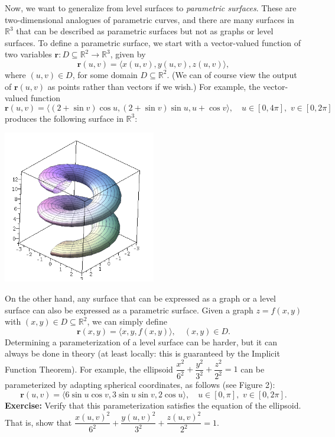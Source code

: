 \documentclass[12pt,letterpaper]{article}
\newcommand{\R}{\mathbb{R}}
\renewcommand{\r}{\mathbf{r}}
\begin{document}
Now, we want to generalize from level surfaces to \textit{parametric surfaces}. These are two-dimensional analogues of parametric curves, and there are many surfaces in $\R^3$ that can be described as parametric surfaces but not as graphs or level surfaces. To define a parametric surface, we start with a vector-valued function of two variables $\r:D\subseteq \R^2\to\R^3$, given by
\[
 \r(u,v) = \langle x(u,v), y(u,v), z(u,v)\rangle,
\]
where $(u,v)\in D$, for some domain $D\subseteq \R^2$. (We can of course view the output of $\r(u,v)$ as points rather than vectors if we wish.) For example, the vector-valued function
\[
 \r(u,v) = \langle (2+\sin v)\cos u, (2+\sin v)\sin u, u+\cos v\rangle, \quad u\in [0,4\pi], \, \, v\in [0,2\pi]
\]
produces the following surface in $\R^3$:

\begin{center}
 \includegraphics[width=0.5\textwidth]{snake.png}
\end{center}

On the other hand, any surface that can be expressed as a graph or a level surface can also be expressed as a parametric surface. Given a graph $z=f(x,y)$ with $(x,y)\in D\subseteq \R^2$, we can simply define
\[
 \r(x,y) = \langle x, y, f(x,y)\rangle, \quad (x,y)\in D.
\]
Determining a parameterization of a level surface can be harder, but it can always be done in theory (at least locally: this is guaranteed by the Implicit Function Theorem). For example, the ellipsoid $\dfrac{x^2}{6^2}+\dfrac{y^2}{3^2}+\dfrac{z^2}{2^2}=1$ can be parameterized by adapting spherical coordinates, as follows (see Figure 2):
\[
 \r(u,v) = \langle 6\sin u\cos v, 3\sin u\sin v, 2\cos u\rangle, \quad u\in [0,\pi], \, \, v\in [0,2\pi].
\]
\textbf{Exercise:} Verify that this parameterization satisfies the equation of the ellipsoid. That is, show that $\dfrac{x(u,v)^2}{6^2}+\dfrac{y(u,v)^2}{3^2}+\dfrac{z(u,v)^2}{2^2}=1$.
\end{document}
